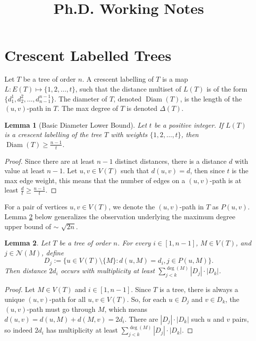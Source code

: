 \documentclass[12]{article}
\title{ \vspace{-3cm} Ph.D. Working Notes }
\DeclareMathOperator{\diam}{Diam}
\newtheorem{lem}{Lemma} %
\theoremstyle{definition}
\begin{document}
	\maketitle
	\tableofcontents
	
	\section{Crescent Labelled Trees}
	
	Let $T$ be a tree of order $n$.  A crescent labelling of $T$ is a map $L: E(T) \mapsto \{1,2, \ldots, t\}$, such that the distance multiset of $L(T)$ is of the form $\{d_1^1,d_2^2, \ldots, d_{n-1}^{n-1}\}$.  The diameter of $T$, denoted $\diam(T)$, is the length of the $(u,v)$-path in $T$.  The max degree of $T$ is denoted $\Delta(T)$.  %
	

\begin{lem}[Basic Diameter Lower Bound]
	Let $t$ be a positive integer.  If $L(T)$ is a crescent labelling of the tree $T$ with weights $\{1,2,\ldots,t\}$, then $\diam(T) \geq \tfrac{n-1}{t}$.
\end{lem}

\begin{proof}
	Since there are at least $n-1$ distinct distances, there is a distance $d$ with value at least $n-1$.  Let $u,v \in V(T)$ such that $d(u,v) = d$, then since $t$ is the max edge weight, this means that the number of edges on a $(u,v)$-path is at least $\tfrac{d}{t} \geq \tfrac{n-1}{t}$.
\end{proof}
	
	
	For a pair of vertices $u,v \in V(T)$, we denote the $(u,v)$-path in $T$ as $P(u,v)$.  Lemma \ref{Lemma-DegreeClasses} below generalizes the observation underlying the maximum degree upper bound of $\sim$ $\sqrt{2n}$.
	
	\begin{lem}\label{Lemma-DegreeClasses}
		Let $T$ be a tree of order $n$.  For every $i \in [1,n-1]$, $M \in V(T)$, and $j \in \mathcal{N}(M)$, define
		$$D_j := \{u \in V(T) \setminus \{M\}: d(u,M) = d_i, j \in P(u,M)\}.$$
		Then distance $2d_i$ occurs with multiplicity at least $\sum_{j < k}^{\deg(M)} |D_j|\cdot |D_k|$.
	\end{lem}

	\begin{proof}
		Let $M \in V(T)$ and $i \in [1,n-1]$.  Since $T$ is a tree, there is always a unique $(u,v)$-path for all $u,v \in V(T)$.  So, for each $u \in D_j$ and $v \in D_k$, the $(u,v)$-path must go through $M$, which means $d(u,v) = d(u,M) + d(M,v) = 2d_i$.  There are $|D_j| \cdot |D_k|$ such $u$ and $v$ pairs, so indeed $2d_i$ has multiplicity at least $\sum_{j < k}^{\deg(M)} |D_j|\cdot |D_k|$. \qedhere
	\end{proof}
	
\end{document}
